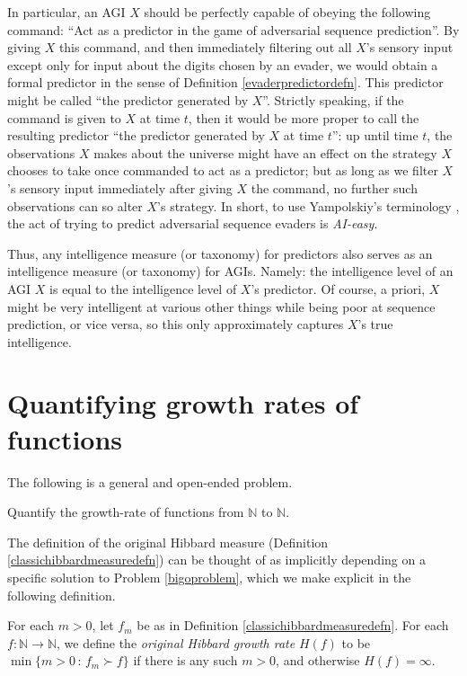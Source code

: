 \documentclass[twoside,11pt]{article}
\begin{document}
In particular, an AGI $X$ should be perfectly capable of obeying the following command:
``Act as a predictor in the game of adversarial sequence prediction''.
By giving $X$ this command, and then immediately filtering out all $X$'s
sensory input except only for input about the digits chosen by an evader,
we would obtain a formal predictor in the sense of Definition \ref{evaderpredictordefn}.
This predictor might be called ``the predictor generated by $X$''. Strictly speaking,
if the command is given to $X$ at time $t$, then it would be more proper to call
the resulting predictor ``the predictor generated by $X$ at time $t$'': up until
time $t$, the observations $X$ makes about the universe might have an effect on
the strategy $X$ chooses to take once commanded to act as a predictor; but as long
as we filter $X$'s sensory input immediately after giving $X$ the command, no
further such observations can so alter $X$'s strategy.
In short, to use Yampolskiy's terminology \citep{yampolskiy2012ai}, the act of
trying to predict adversarial sequence evaders is \emph{AI-easy}.

Thus, any intelligence measure (or taxonomy) for predictors also serves as an intelligence
measure (or taxonomy) for AGIs. Namely: the intelligence level of an AGI $X$ is equal to the
intelligence level of $X$'s predictor. Of course, a priori,
$X$ might be very intelligent at various other things while being poor
at sequence prediction, or vice versa, so this only
approximately captures $X$'s true intelligence.


\section{Quantifying growth rates of functions}
\label{growthratesection}

The following is a general and open-ended problem.

\begin{problem}
\label{bigoproblem}
    Quantify the growth-rate of functions from $\mathbb N$ to $\mathbb N$.
\end{problem}

The definition of the original Hibbard measure
(Definition \ref{classichibbardmeasuredefn})
can be thought of as implicitly depending on a specific solution to Problem
\ref{bigoproblem}, which we make explicit in the following definition.

\begin{definition}
\label{hibbardgrowthratedefn}
    For each $m>0$, let $f_m$ be as in Definition \ref{classichibbardmeasuredefn}.
    For each $f:\mathbb N\to\mathbb N$, we define the \emph{original Hibbard growth rate}
    $H(f)$ to be $\min\{m>0\,:\,f_m\succ f\}$ if there is any such $m>0$, and otherwise
    $H(f)=\infty$.
\end{definition}
\end{document}
